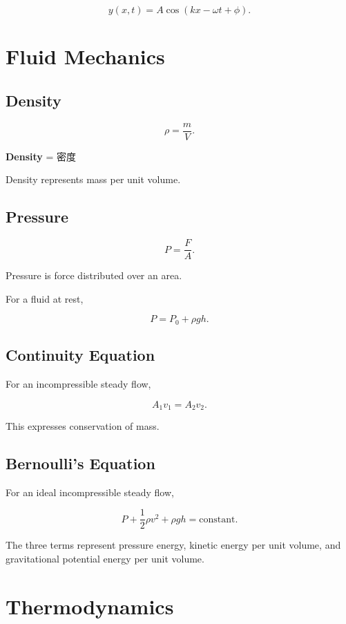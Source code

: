 \documentclass[11pt,a4paper]{article}
\begin{document}
\[
y(x,t)=A\cos(kx-\omega t+\phi).
\]

\section{Fluid Mechanics}

\subsection{Density}

\[
\rho=\frac{m}{V}.
\]

\textbf{Density} = 密度

Density represents mass per unit volume.

\subsection{Pressure}

\[
P=\frac{F}{A}.
\]

Pressure is force distributed over an area.

For a fluid at rest,

\[
P=P_0+\rho gh.
\]

\subsection{Continuity Equation}

For an incompressible steady flow,

\[
A_1v_1=A_2v_2.
\]

This expresses conservation of mass.

\subsection{Bernoulli's Equation}

For an ideal incompressible steady flow,

\[
P+\frac12\rho v^2+\rho gh
=
\text{constant}.
\]

The three terms represent pressure energy, kinetic energy per unit volume, and gravitational potential energy per unit volume.

\section{Thermodynamics}
\end{document}

